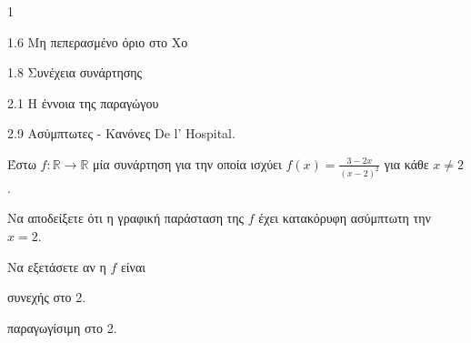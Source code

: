 \begin{ylh}{1}
    \item 1.6 Μη πεπερασμένο όριο στο Χο
    \item 1.8 Συνέχεια συνάρτησης
    \item 2.1 Η έννοια της παραγώγου
    \item 2.9 Ασύμπτωτες - Κανόνες De l’ Hospital.
\end{ylh}
Έστω $f: \mathbb{R} \to \mathbb{R}$ μία συνάρτηση για την οποία ισχύει $f(x) = \frac{3-2x}{(x-2)^2}$ για κάθε $x \neq 2$.
\begin{alist}
\item Να αποδείξετε ότι η γραφική παράσταση της $f$ έχει κατακόρυφη ασύμπτωτη την $x=2$. 
\item Να εξετάσετε αν η $f$ είναι
    \begin{rlist}
        \item συνεχής στο 2. 
        \item παραγωγίσιμη στο 2. 
    \end{rlist}
\end{alist}